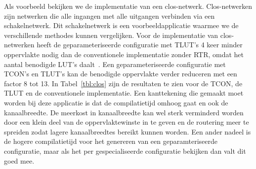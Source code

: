 \documentclass[a4paper,oneside,12pt]{article}
\begin{document}
Als voorbeeld bekijken we de implementatie van een clos-netwerk. Clos-netwerken zijn netwerken die alle ingangen met alle uitgangen verbinden via een schakelnetwerk. Dit schakelnetwerk is een voorbeeldapplicatie waarmee we de verschillende methodes kunnen vergelijken. Voor de implementatie van clos-netwerken heeft de geparameteriseerde configuratie met TLUT's 4 keer minder oppervlakte nodig dan de conventionele implementatie zonder RTR, omdat het aantal benodigde LUT's daalt~\cite{phdkarel}. Een geparameteriseerde configuratie met TCON's en TLUT's kan de benodigde oppervlakte verder reduceren met een factor 8 tot 13. In Tabel~\ref{tbl:clos} zijn de resultaten te zien voor de TCON, de TLUT en de conventionele implementatie. Een kanttekening die gemaakt moet worden bij deze applicatie is dat de compilatietijd omhoog gaat en ook de kanaalbreedte. De meerkost in kanaalbreedte kan wel sterk verminderd worden door een klein deel van de oppervlaktewinste in te geven en de routering meer te spreiden zodat lagere kanaalbreedtes bereikt kunnen worden. Een ander nadeel is de hogere compilatietijd voor het genereren van een geparamteriseerde configuratie, maar als het per gespecialiseerde configuratie bekijken dan valt dit goed mee. 
\end{document}

